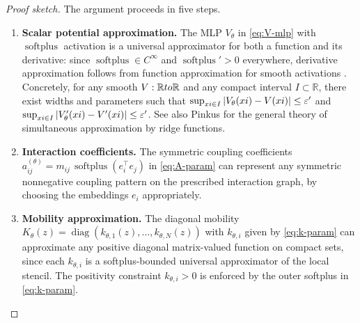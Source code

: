 \documentclass[11pt]{article}
\newcommand{\R}{\mathbb{R}}
\newcommand{\diag}{\operatorname{diag}}
\newcommand{\softplus}{\operatorname{softplus}}
\begin{document}
\begin{proof}[Proof sketch]
The argument proceeds in five steps.
\begin{enumerate}
    \item \textbf{Scalar potential approximation.} The MLP $V_{\theta}$ in \eqref{eq:V-mlp} with $\softplus$ activation is a universal approximator for both a function and its derivative: since $\softplus\in C^{\infty}$ and $\softplus'>0$ everywhere, derivative approximation follows from function approximation for smooth activations \cite{Cybenko1989,Hornik1991Approximation}. Concretely, for any smooth $V:\R\\to\R$ and any compact interval $I\subset\R$, there exist widths and parameters such that $\sup_{\\xi\in I}|V_{\theta}(\\xi)-V(\\xi)|\le \varepsilon'$ and $\sup_{\\xi\in I}|V_{\theta}'(\\xi)-V'(\\xi)|\le \varepsilon'$. See also Pinkus \cite{Pinkus1999Approximation} for the general theory of simultaneous approximation by ridge functions.

    \item \textbf{Interaction coefficients.} The symmetric coupling coefficients $a_{ij}^{(\theta)}=m_{ij}\,\softplus(e_i^\top e_j)$ in \eqref{eq:A-param} can represent any symmetric nonnegative coupling pattern on the prescribed interaction graph, by choosing the embeddings $e_i$ appropriately.

    \item \textbf{Mobility approximation.} The diagonal mobility $K_{\theta}(z)=\diag(k_{\theta,1}(z),\dots,k_{\theta,N}(z))$ with $k_{\theta,i}$ given by \eqref{eq:k-param} can approximate any positive diagonal matrix-valued function on compact sets, since each $k_{\theta,i}$ is a softplus-bounded universal approximator of the local stencil. The positivity constraint $k_{\theta,i}>0$ is enforced by the outer softplus in \eqref{eq:k-param}.


\end{enumerate}
\end{proof}
\end{document}
